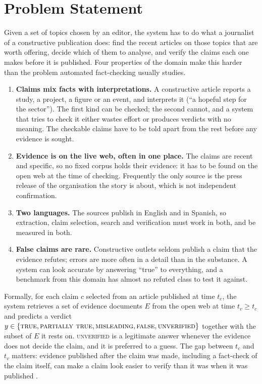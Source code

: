 
\section{Problem Statement}
\label{sec:problem}

Given a set of topics chosen by an editor, the system has to do what a
journalist of a constructive publication does: find the recent
articles on those topics that are worth offering, decide which of them
to analyse, and verify the claims each one makes before it is
published. Four properties of the domain make this harder than the
problem automated fact-checking usually studies.

\begin{enumerate}
    \item \textbf{Claims mix facts with interpretations.} A
    constructive article reports a study, a project, a figure or an
    event, and interprets it (``a hopeful step for the sector''). The
    first kind can be checked; the second cannot, and a system that
    tries to check it either wastes effort or produces verdicts with no
    meaning. The checkable claims have to be told apart from the rest
    before any evidence is sought.
    \item \textbf{Evidence is on the live web, often in one place.} The
    claims are recent and specific, so no fixed corpus holds their
    evidence: it has to be found on the open web at the time of
    checking. Frequently the only source is the press release of the
    organisation the story is about, which is not independent
    confirmation.
    \item \textbf{Two languages.} The sources publish in English and in
    Spanish, so extraction, claim selection, search and verification
    must work in both, and be measured in both.
    \item \textbf{False claims are rare.} Constructive outlets seldom
    publish a claim that the evidence refutes; errors are more often in
    a detail than in the substance. A system can look accurate by
    answering ``true'' to everything, and a benchmark from this domain
    has almost no refuted class to test it against.
\end{enumerate}

Formally, for each claim $c$ selected from an article published at time
$t_c$, the system retrieves a set of evidence documents $E$ from the
open web at time $t_v \geq t_c$ and predicts a verdict
$y \in \{\textsc{true}, \textsc{partially true}, \textsc{misleading},
\textsc{false}, \textsc{unverified}\}$ together with the subset of $E$
it rests on. \textsc{unverified} is a legitimate answer whenever the
evidence does not decide the claim, and it is preferred to a guess.
The gap between $t_c$ and $t_v$ matters: evidence published after the
claim was made, including a fact-check of the claim itself, can make a
claim look easier to verify than it was when it was published
\cite{glockner2022missing}.
